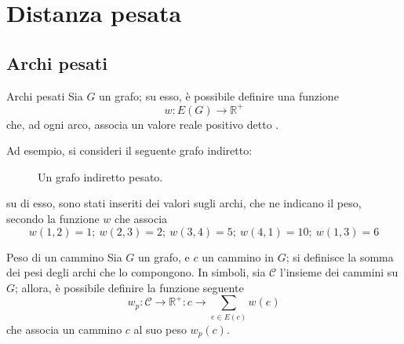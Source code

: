 \documentclass[a4paper, 12pt]{report}
\begin{document}
    \section{Distanza pesata}

    \subsection{Archi pesati}

    \begin{frameddefn}{Archi pesati}
        Sia $G$ un grafo; su esso, è possibile definire una funzione $$w: E(G) \rightarrow \mathbb{R}^+$$ che, ad ogni arco, associa un valore reale positivo detto .
    \end{frameddefn}

    \begin{example}
        Ad esempio, si consideri il seguente grafo indiretto:

        \begin{figure}[H]
            \centering
            \caption{Un grafo indiretto pesato.}
        \end{figure}

        su di esso, sono stati inseriti dei valori sugli archi, che ne indicano il peso, secondo la funzione $w$ che associa $$w(1, 2) = 1; \ w(2,3)=2; \ w(3, 4)=5; \ w(4, 1)=10; \ w(1,3)=6$$
    \end{example}

    \begin{frameddefn}{Peso di un cammino}
        Sia $G$ un grafo, e $c$ un cammino in $G$; si definisce  la somma dei pesi degli archi che lo compongono. In simboli, sia $\mathcal {C}$ l'insieme dei cammini su $G$; allora, è possibile definire la funzione seguente $$w_p : \mathcal{C} \rightarrow \mathbb{R}^+: c \rightarrow \displaystyle \sum_{e \in E(c)}{w(e)}$$ che associa un cammino $c$ al suo peso $w_p(c)$.
    \end{frameddefn}
\end{document}

